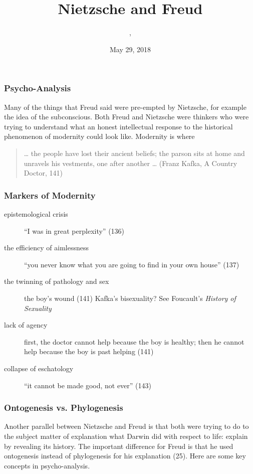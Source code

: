 \documentclass[xcolor=dvipsnames]{beamer}
\title{Nietzsche and Freud}
\subtitle{{\CourseNumber}, {\CourseInst}}
\author{\CourseName}
\date{May 29, 2018}
\begin{document}
\begin{frame}
  \titlepage
\end{frame}

\begin{frame}
  \frametitle{Psycho-Analysis} 
  Many of the things that Freud said were pre-empted by Nietzsche, for
  example the idea of the subconscious. Both Freud and Nietzsche were
  thinkers who were trying to understand what an honest intellectual
  response to the historical phenomenon of modernity could look like.
  Modernity is where
\begin{quote}
  {\ldots} the people have lost their ancient beliefs; the parson sits
  at home and unravels his vestments, one after another {\ldots}
  (Franz Kafka, A Country Doctor, 141)
\end{quote}
\end{frame}

\begin{frame}
  \frametitle{Markers of Modernity} 
  \begin{description}
  \item[epistemological crisis] ``I was in great perplexity'' (136)
  \item[the efficiency of aimlessness] ``you never know what you are
    going to find in your own house'' (137)
  \item[the twinning of pathology and sex] the boy's wound (141)
    Kafka's bisexuality? See Foucault's \emph{History of Sexuality}
  \item[lack of agency] first, the doctor cannot help because the boy
    is healthy; then he cannot help because the boy is past helping (141)
  \item[collapse of eschatology] ``it cannot be made good, not ever''
    (143)
  \end{description}
\end{frame}

\begin{frame}
  \frametitle{Ontogenesis vs. Phylogenesis} Another parallel between
  Nietzsche and Freud is that both were trying to do to the subject
  matter of explanation what Darwin did with respect to life: explain
  by revealing its history. The important difference for Freud is that
  he used \alert{ontogenesis} instead of \alert{phylogenesis} for his
  explanation (25). Here are some key concepts in psycho-analysis.
\end{frame}
\end{document}

